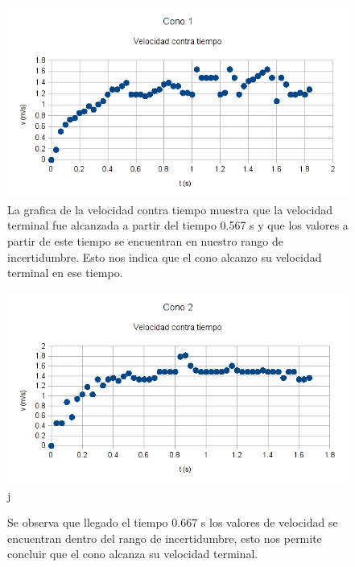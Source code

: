 \begin{figure}[h!]
    \centering
    \includegraphics{vel_cono1}
    \caption{La grafica de la velocidad contra tiempo muestra que la velocidad terminal
    fue alcanzada a partir del tiempo 0.567 s y que los valores a partir de este
    tiempo se encuentran en nuestro rango de incertidumbre. Esto nos indica que el
    cono alcanzo su velocidad terminal en ese tiempo.}
    \label{fig:VelCono1}
\end{figure}

\begin{figure}[h!]
    \centering
    \includegraphics{vel_cono2}j
    \caption{Se observa que llegado el tiempo 0.667 s los valores de velocidad se encuentran
    dentro del rango de incertidumbre, esto nos permite concluir que 
    el cono alcanza su velocidad terminal.}
    \label{fig:VelCono2}
\end{figure}

